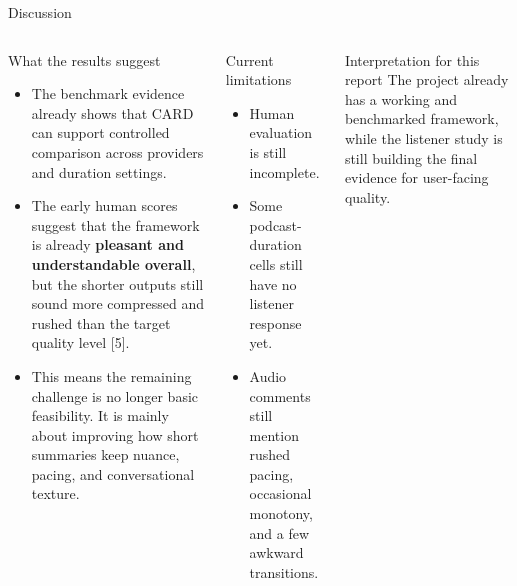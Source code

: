 \documentclass[aspectratio=169,10pt]{beamer}
\newcommand{\framebibtext}{}
\newcommand{\setframebib}[1]{\gdef\framebibtext{#1}}
\newcommand{\refHumanEval}{[5] ``Human-evaluation response CSV and listener-response log,'' unpublished raw evaluation data, Apr. 2026.}
\begin{document}
\begin{frame}{Discussion}
\setframebib{\refHumanEval}
\small
\begin{columns}[T,totalwidth=\textwidth]
\begin{block}{What the results suggest}
{\scriptsize
\begin{itemize}
  \item The benchmark evidence already shows that CARD can support controlled comparison across providers and duration settings.
  \item The early human scores suggest that the framework is already \textbf{pleasant and understandable overall}, but the shorter outputs still sound more compressed and rushed than the target quality level [5].
  \item This means the remaining challenge is no longer basic feasibility. It is mainly about improving how short summaries keep nuance, pacing, and conversational texture.
\end{itemize}
}
\end{block}

\begin{block}{Current limitations}
{\scriptsize
\begin{itemize}
  \item Human evaluation is still incomplete.
  \item Some podcast-duration cells still have no listener response yet.
  \item Audio comments still mention rushed pacing, occasional monotony, and a few awkward transitions.
\end{itemize}
}
\end{block}

\begin{alertblock}{Interpretation for this report}
{\scriptsize The project already has a working and benchmarked framework, while the listener study is still building the final evidence for user-facing quality.}
\end{alertblock}
\end{columns}
\end{frame}
\end{document}
